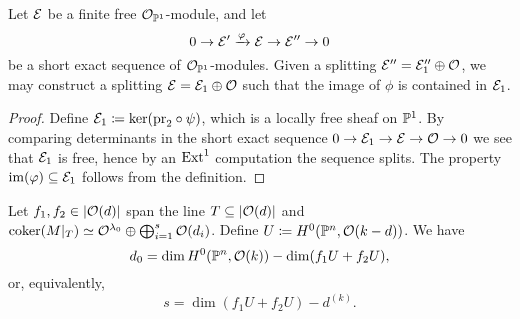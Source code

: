 
\begin{lemma} \label{mini-splitting-lemma}
	Let $\mathcal{E}$ be a finite free $\mathcal{O}_{\mathbb{P}^1}$-module, and let 
	\[
		0 \to \mathcal{E}' \xrightarrow{\varphi} \mathcal{E} \to \mathcal{E}'' \to 0
 	\]
 	be a short exact sequence of $\mathcal{O}_{\mathbb{P}^1}$-modules. Given a splitting $\mathcal{E}'' = \mathcal{E}''_1 \oplus \mathcal{O}$, we may construct a splitting $\mathcal{E} = \mathcal{E}_1 \oplus \mathcal{O}$ such that the image of $\phi$ is contained in $\mathcal{E}_1$.
\end{lemma}

\begin{proof}
	Define $\mathcal{E}_1 \coloneqq \ker(\mathrm{pr}_2\circ\psi)$, which is a locally free sheaf on $\mathbb{P}^1$. By comparing determinants in the short exact sequence $0 \to \mathcal{E}_1 \to \mathcal{E} \to \mathcal{O} \to 0$ we see that $\mathcal{E}_1$ is free, hence by an $\operatorname{Ext}^1$ computation the sequence splits. The property $\operatorname{im}(\varphi) \subseteq \mathcal{E}_1$ follows from the definition.
\end{proof}

\begin{proposition} \label{number-zeroes}
	Let $f_1, f_2 \in \lvert\mathcal{O}(d)\rvert$ span the line
	$T \subseteq \lvert\mathcal{O}(d)\rvert$ and $\operatorname{coker}(M|_{T}) \simeq \mathcal{O}^{\lambda_0}
	\oplus \bigoplus_{i=1}^s \mathcal{O}(d_i)$. Define $U\coloneqq H^0(\mathbb{P}^n,\mathcal{O}(k-d))$. We have $$d_0 = \dim H^0(\mathbb{P}^n,\mathcal{O}(k)) - \dim ({f_1 U + f_2 U}),$$
	or, equivalently,
	\[
		s = \dim({f_1 U + f_2 U}) - d^{(k)}.
	\]
\end{proposition}

